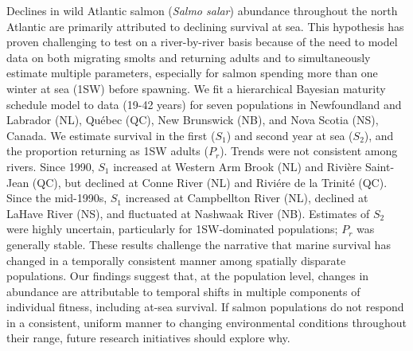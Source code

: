 \documentclass[12pt]{article}
\newcommand{\So}{$S_{1}$\xspace}
\newcommand{\St}{$S_{2}$\xspace}
\newcommand{\Pg}{$P_r$\xspace}
\begin{document}
Declines in wild Atlantic salmon (\emph{Salmo salar}) abundance throughout the north
Atlantic are primarily attributed to declining survival at sea. This
hypothesis has proven challenging to test on a river-by-river basis because of
the need to model data on both migrating smolts and returning adults and to
simultaneously estimate multiple parameters, especially for salmon spending
more than one winter at sea (1SW) before spawning. We fit a hierarchical Bayesian
maturity schedule model to data (19-42 years) for seven populations in  
Newfoundland and Labrador (NL), Qu\'{e}bec (QC), New Brunswick (NB), and Nova
Scotia (NS), Canada. We estimate survival in the first (\So) and second year at sea (\St),
and the proportion returning as 1SW adults (\Pg). Trends were not consistent
among rivers. Since 1990, \So increased at Western Arm Brook (NL)
and Rivi\`{e}re Saint-Jean (QC), but declined at Conne River (NL) and Rivi\'{e}re
de la Trinit\'{e} (QC). Since the mid-1990s, \So increased at Campbellton River (NL),
declined at LaHave River (NS), and fluctuated at Nashwaak
River (NB). Estimates of \St were highly uncertain, particularly for
1SW-dominated populations; \Pg was generally stable. These results challenge the
narrative that marine survival has changed in a temporally consistent manner
among spatially disparate populations. Our findings suggest that, at the
population level, changes in abundance are attributable to temporal shifts in
multiple components of individual fitness, including at-sea survival. If
salmon populations do not respond in a consistent, uniform manner to changing
environmental conditions throughout their range, future research initiatives
should explore why.
\end{document}
